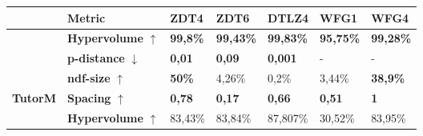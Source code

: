 \begin{table}[h]
    \centering
    \begin{tabular}{@{}lllllll@{}}
    \toprule
                                                                                              & Metric      & ZDT4                                     & ZDT6                                     & DTLZ4                                     & WFG1                                     & WFG4                                     \\ \midrule
                                                                                              & \textbf{Hypervolume} $\uparrow$  & \cellcolor[HTML]{EFEFEF}\textbf{99,8\%} & \cellcolor[HTML]{EFEFEF}\textbf{99,43\%} & \cellcolor[HTML]{EFEFEF}\textbf{99,83\%} & \cellcolor[HTML]{EFEFEF}\textbf{95,75\%} & \cellcolor[HTML]{EFEFEF}\textbf{99,28\%} \\
                                                                                              & \textbf{p-distance} $\downarrow$  & \cellcolor[HTML]{EFEFEF}\textbf{0,01}    & \cellcolor[HTML]{EFEFEF}\textbf{0,09}    & \cellcolor[HTML]{EFEFEF}\textbf{0,001}    & -                                        & -                                        \\
                                                                                              & \textbf{ndf-size} $\uparrow$     & \cellcolor[HTML]{EFEFEF}\textbf{50\%}                          & 4,26\%                                   & 0,2\%                                     & 3,44\%                                   & \cellcolor[HTML]{EFEFEF}\textbf{38,9\%} \\
    \multirow{-4}{*}{\textbf{TutorM}}                                                         & \textbf{Spacing} $\uparrow$      & \cellcolor[HTML]{EFEFEF}\textbf{0,78}    & \cellcolor[HTML]{EFEFEF}\textbf{0,17}    & \cellcolor[HTML]{EFEFEF}\textbf{0,66}    & \cellcolor[HTML]{EFEFEF}\textbf{0,51}    & \cellcolor[HTML]{EFEFEF}\textbf{1}       \\ \midrule
                                                                                              & \textbf{Hypervolume} $\uparrow$  & 83,43\%                                  & 83,84\%                                  & 87,807\%                                  & 30,52\%                                  & 83,95\%                                  \\ 

\end{tabular}
\end{table}
